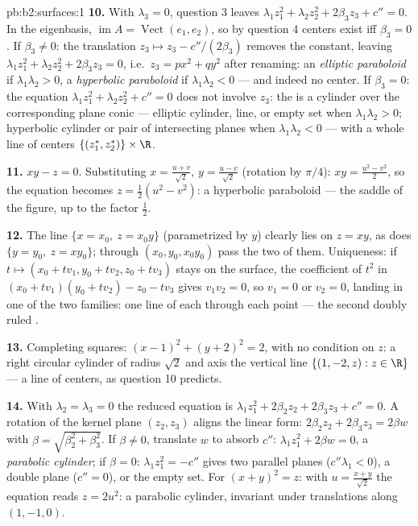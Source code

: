 \begin{solution}{pb:b2:surfaces:1}
\textbf{10.} With $\lambda_3 = 0$, question 3 leaves
$\lambda_1z_1^2 + \lambda_2z_2^2 + 2\beta_3z_3 + c'' = 0$. In
the eigenbasis, $\operatorname{im}A = \operatorname{Vect}(e_1,
e_2)$, so by question 4 centers exist iff $\beta_3 = 0$. If
$\beta_3 \neq 0$: the translation $z_3 \mapsto z_3 -
c''/(2\beta_3)$ removes the constant, leaving $\lambda_1z_1^2
+ \lambda_2z_2^2 + 2\beta_3z_3 = 0$, i.e.\ $z_3 = px^2 +
qy^2$ after renaming: an \emph{elliptic paraboloid} if
$\lambda_1\lambda_2 > 0$, a \emph{hyperbolic paraboloid} if
$\lambda_1\lambda_2 < 0$ --- and indeed no center. If
$\beta_3 = 0$: the equation $\lambda_1z_1^2 + \lambda_2z_2^2 +
c'' = 0$ does not involve $z_3$: the  is a cylinder
over the corresponding plane conic --- elliptic cylinder,
line, or empty set when $\lambda_1\lambda_2 > 0$; hyperbolic
cylinder or pair of intersecting planes when
$\lambda_1\lambda_2 < 0$ --- with a whole line of centers
$\{(z_1^*, z_2^*)\} \times \R$.

\textbf{11.} $xy - z = 0$. Substituting $x = \frac{u +
v}{\sqrt2}$, $y = \frac{u - v}{\sqrt2}$ (rotation by $\pi/4$):
$xy = \frac{u^2 - v^2}2$, so the equation becomes $z =
\frac12(u^2 - v^2)$: a hyperbolic paraboloid --- the saddle
of the figure, up to the factor $\frac12$.

\textbf{12.} The line $\{x = x_0,\ z = x_0y\}$ (parametrized
by $y$) clearly lies on $z = xy$, as does $\{y = y_0,\ z =
xy_0\}$; through $(x_0, y_0, x_0y_0)$ pass the two of them.
Uniqueness: if $t \mapsto (x_0 + tv_1, y_0 + tv_2, z_0 +
tv_3)$ stays on the surface, the coefficient of $t^2$ in $(x_0
+ tv_1)(y_0 + tv_2) - z_0 - tv_3$ gives $v_1v_2 = 0$, so
$v_1 = 0$ or $v_2 = 0$, landing in one of the two families:
one line of each through each point --- the second doubly
ruled .

\textbf{13.} Completing squares: $(x - 1)^2 + (y + 2)^2 = 2$,
with no condition on $z$: a right circular cylinder of radius
$\sqrt2$ and axis the vertical line $\{(1, -2, z) : z \in
\R\}$ --- a line of centers, as question 10 predicts.

\textbf{14.} With $\lambda_2 = \lambda_3 = 0$ the reduced
equation is $\lambda_1z_1^2 + 2\beta_2z_2 + 2\beta_3z_3 + c''
= 0$. A rotation of the kernel plane $(z_2, z_3)$ aligns the
linear form: $2\beta_2z_2 + 2\beta_3z_3 = 2\beta w$ with
$\beta = \sqrt{\beta_2^2 + \beta_3^2}$. If $\beta \neq 0$,
translate $w$ to absorb $c''$: $\lambda_1z_1^2 + 2\beta w =
0$, a \emph{parabolic cylinder}; if $\beta = 0$:
$\lambda_1z_1^2 = -c''$ gives two parallel planes ($c''
\lambda_1 < 0$), a double plane ($c'' = 0$), or the empty
set. For $(x + y)^2 = z$: with $u = \frac{x + y}{\sqrt2}$ the
equation reads $z = 2u^2$: a parabolic cylinder, invariant
under translations along $(1, -1, 0)$.


\end{solution}
